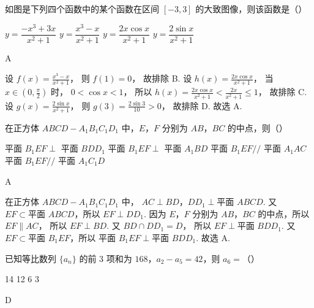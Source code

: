 \begin{problem}
如图是下列四个函数中的某个函数在区间 \([-3,3]\) 的大致图像，则该函数是（\quad）

\choices
    {\(y=\dfrac{-x^3+3x}{x^2+1}\)}
    {\(y=\dfrac{x^3-x}{x^2+1}\)}
    {\(y=\dfrac{2x\cos x}{x^2+1}\)}
    {\(y=\dfrac{2\sin x}{x^2+1}\)}
\end{problem}

\begin{answer}
A
\end{answer}

\begin{solution}
设
\(f(x)=\frac{x^3-x}{x^2+1}\)，
则
\(f(1)=0\)，
故排除 B.
设
\(h(x)=\frac{2x\cos x}{x^2+1}\)，
当 \(x\in\left(0,\frac{\pi}{2}\right)\) 时，
\(0<\cos x<1\)，
所以
\(h(x)=\frac{2x\cos x}{x^2+1}<\frac{2x}{x^2+1}\le1\)，
故排除 C.
设
\(g(x)=\frac{2\sin x}{x^2+1}\)，
则
\(g(3)=\frac{2\sin3}{10}>0\)，
故排除 D.
故选 A.
\end{solution}

\begin{problem}
在正方体 \(ABCD-A_1B_1C_1D_1\) 中，\(E\)，\(F\) 分别为 \(AB\)，\(BC\) 的中点，则（\quad）

\choices
    {平面 \(B_1EF\perp\) 平面 \(BDD_1\)}
    {平面 \(B_1EF\perp\) 平面 \(A_1BD\)}
    {平面 \(B_1EF//\) 平面 \(A_1AC\)}
    {平面 \(B_1EF//\) 平面 \(A_1C_1D\)}
\end{problem}

\begin{answer}
A
\end{answer}

\begin{solution}
在正方体 \(ABCD-A_1B_1C_1D_1\) 中，
\(AC\perp BD\)，\(DD_1\perp \text{平面 }ABCD\).
又 \(EF\subset \text{平面 }ABCD\)，所以
\(EF\perp DD_1\).
因为 \(E\)，\(F\) 分别为 \(AB\)，\(BC\) 的中点，所以
\(EF\parallel AC\)，
所以
\(EF\perp BD\).
又
\(BD\cap DD_1=D\)，
所以
\(EF\perp \text{平面 }BDD_1\).
又 \(EF\subset \text{平面 }B_1EF\)，所以
\(\text{平面 }B_1EF\perp \text{平面 }BDD_1\).
故选 A.
\end{solution}

\begin{problem}
已知等比数列 \(\{a_n\}\) 的前 \(3\) 项和为 \(168\)，\(a_2-a_5=42\)，则 \(a_6=\)（\quad）

\choices
    {14}
    {12}
    {6}
    {3}
\end{problem}

\begin{answer}
D
\end{answer}

